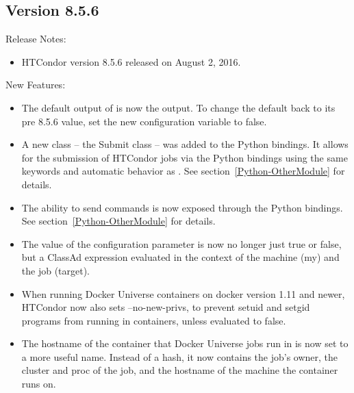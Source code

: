 \subsection*{\label{sec:New-8-5-6}Version 8.5.6}

\noindent Release Notes:

\begin{itemize}

\item HTCondor version 8.5.6 released on August 2, 2016.

\end{itemize}


\noindent New Features:

\begin{itemize}

\item The default output of  is now the  output. To change
the default back to its pre 8.5.6 value, set the new configuration variable
  to false.

\item A new class -- the Submit class -- was added to the Python
bindings. It allows for the submission of HTCondor jobs via the
Python bindings using the same keywords and automatic behavior as
.
See section~\ref{Python-OtherModule} for details.

\item The ability to send  commands is now exposed
through the Python bindings.
See section~\ref{Python-OtherModule} for details.

\item The value of the configuration parameter 
 is now no longer just
true or false, but a ClassAd expression evaluated in the context
of the machine (my) and the job (target).

\item When running Docker Universe containers on docker version 1.11
and newer, HTCondor now also sets --no-new-privs, to prevent
setuid and setgid programs from running in containers, unless
 evaluated to false.

\item The hostname of the container that Docker Universe jobs
run in is now set to a more useful name.  Instead of a hash, it
now contains the job's owner, the cluster and proc of the job,
and the hostname of the machine the container runs on.


\end{itemize}
